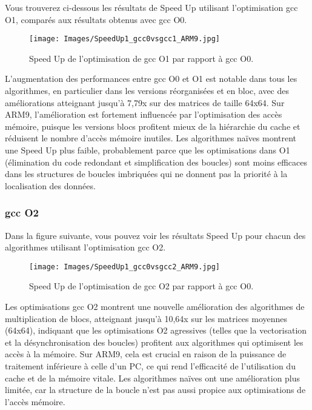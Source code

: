 \documentclass[../CSC_5RO06_TA.tex]{subfiles}
\begin{document}
Vous trouverez ci-dessous les résultats de Speed Up utilisant l'optimisation gcc O1, comparés aux résultats obtenus avec gcc O0.

\begin{figure}[H]
    \centering
    \texttt{[image: Images/SpeedUp1\_gcc0vsgcc1\_ARM9.jpg]}
    \caption{Speed Up de l'optimisation de gcc O1 par rapport à gcc O0.}
    \label{fig:7}
\end{figure}

L'augmentation des performances entre gcc O0 et O1 est notable dans tous les algorithmes, en particulier dans les versions réorganisées et en bloc, avec des améliorations atteignant jusqu'à 7,79x sur des matrices de taille 64x64. Sur ARM9, l'amélioration est fortement influencée par l'optimisation des accès mémoire, puisque les versions blocs profitent mieux de la hiérarchie du cache et réduisent le nombre d'accès mémoire inutiles. Les algorithmes naïves montrent une Speed Up plus faible, probablement parce que les optimisations dans O1 (élimination du code redondant et simplification des boucles) sont moins efficaces dans les structures de boucles imbriquées qui ne donnent pas la priorité à la localisation des données.

\subsubsection{gcc O2}

Dans la figure suivante, vous pouvez voir les résultats Speed Up pour chacun des algorithmes utilisant l'optimisation gcc O2.

\begin{figure}[H]
    \centering
    \texttt{[image: Images/SpeedUp1\_gcc0vsgcc2\_ARM9.jpg]}
    \caption{Speed Up de l'optimisation de gcc O2 par rapport à gcc O0.}
    \label{fig:7}
\end{figure}


Les optimisations gcc O2 montrent une nouvelle amélioration des algorithmes de multiplication de blocs, atteignant jusqu'à 10,64x sur les matrices moyennes (64x64), indiquant que les optimisations O2 agressives (telles que la vectorisation et la désynchronisation des boucles) profitent aux algorithmes qui optimisent les accès à la mémoire. Sur ARM9, cela est crucial en raison de la puissance de traitement inférieure à celle d'un PC, ce qui rend l'efficacité de l'utilisation du cache et de la mémoire vitale. Les algorithmes naïves ont une amélioration plus limitée, car la structure de la boucle n'est pas aussi propice aux optimisations de l'accès mémoire.
\end{document}
